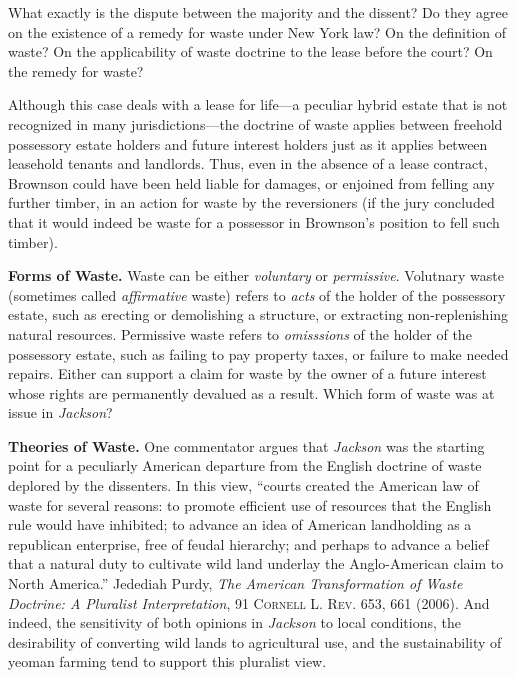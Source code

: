 
\item What exactly is the dispute between the majority and the dissent? Do they
agree on the existence of a remedy for waste under New York law? On the
definition of waste? On the applicability of waste doctrine to the lease before
the court? On the remedy for waste?


\item Although this case deals with a lease for life---a peculiar hybrid estate
that is not recognized in many jurisdictions---the doctrine of waste applies
between freehold possessory estate holders and future interest holders just as
it applies between leasehold tenants and landlords. Thus, even in the absence
of a lease contract, Brownson could have been held liable for damages, or
enjoined from felling any further timber, in an action for waste by the
reversioners (if the jury concluded that it would indeed be waste for a
possessor in Brownson's position to fell such timber).


\item \textbf{Forms of Waste.} Waste can be either \textit{voluntary} or
\textit{permissive}. Volutnary waste (sometimes called \textit{affirmative}
waste) refers to \textit{acts} of the holder of the possessory estate, such as
erecting or demolishing a structure, or extracting non-replenishing natural
resources. Permissive waste refers to \textit{omisssions} of the holder of the
possessory estate, such as failing to pay property taxes, or failure to make
needed repairs. Either can support a claim for waste by the owner of a future
interest whose rights are permanently devalued as a result. Which form of waste
was at issue in \textit{Jackson}?


\item \textbf{Theories of Waste.} One commentator argues that \textit{Jackson}
was the starting point for a peculiarly American departure from the English
doctrine of waste deplored by the dissenters. In this view, ``courts created
the American law of waste for several reasons: to promote efficient use of
resources that the English rule would have inhibited; to advance an idea of
American landholding as a republican enterprise, free of feudal hierarchy; and
perhaps to advance a belief that a natural duty to cultivate wild land underlay
the Anglo-American claim to North America.'' Jedediah Purdy, \textit{The
American Transformation of Waste Doctrine: A Pluralist Interpretation}, 91
\textsc{Cornell L. Rev}. 653, 661 (2006). And indeed, the sensitivity of both
opinions in \textit{Jackson} to local conditions, the desirability of
converting wild lands to agricultural use, and the sustainability of yeoman
farming tend to support this pluralist view.


